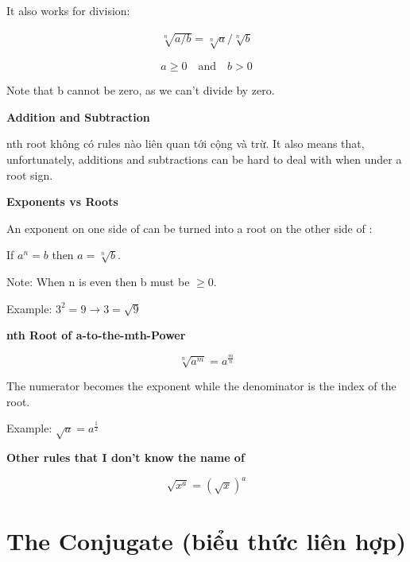 It also works for division:

\begin{equation}
  \begin{aligned}
    \sqrt[n]{a/b}=\sqrt[n]{a}/\sqrt[n]{b}
  \end{aligned}
\end{equation}

\[a \geq 0 \quad \text{and} \quad b > 0\]

Note that b cannot be zero, as we can't divide by zero.

\textbf{Addition and Subtraction}

nth root không có rules nào liên quan tới cộng và trừ. It also means that, unfortunately, additions and subtractions can be hard to deal with when under a root sign.

\textbf{Exponents vs Roots}

An exponent on one side of \q{=} can be turned into a root on the other side of \q{=}:

If \(a^{n}=b\) then \(a=\sqrt[n]{b}\).

Note: When n is even then b must be \(\geq 0\).

Example: $3^{2}=9 \rightarrow 3=\sqrt{9}$



\vspace{5 mm}

\textbf{nth Root of a-to-the-mth-Power}

\[\sqrt[n]{a^{m}}=a^{\frac{m}{n}}\]

The numerator becomes the exponent while the denominator is the index of the root.

Example: $\sqrt{a}=a^{\frac{1}{2}}$

\vspace{5 mm}

\textbf{Other rules that I don't know the name of}

\[\sqrt{x^{a}}= \left( \sqrt{x} \right)^{a}\]

\section{The Conjugate (biểu thức liên hợp)}

